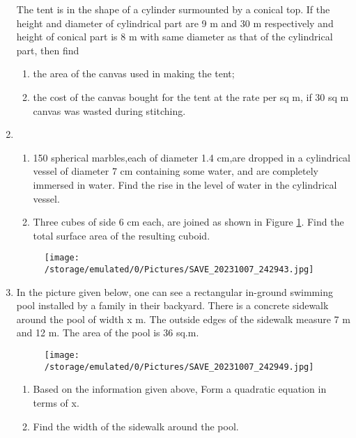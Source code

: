 \documentclass[12pt]{article}
\begin{document}
\begin{enumerate}
     
     The tent is in the shape of a cylinder surmounted by a conical top. If the height and diameter of cylindrical part are 9 m and 30 m respectively and height of conical part is 8 m with same diameter as that of the cylindrical part, then find
     \begin{enumerate}
         \item the area of the canvas used in making the tent;
         \item the cost of the canvas bought for the tent at the rate  per sq m, if 30 sq m canvas was wasted during stitching.
     \end{enumerate}

     \item
       \begin{enumerate}
           \item 150 spherical marbles,each of diameter 1.4 cm,are dropped in a cylindrical vessel of diameter 7 cm containing some water, and are completely immersed in water. Find the rise in the level of water in the cylindrical vessel.
           \item Three cubes of side 6 cm each, are joined as shown in Figure \ref{SAVE_20231007_242943}.
           Find the total surface area of the resulting cuboid.
       \end{enumerate}
       
            \begin{figure}[H]
                \centering
                \texttt{[image: /storage/emulated/0/Pictures/SAVE\_20231007\_242943.jpg]}
                \caption{}
                \label{SAVE_20231007_242943}
            \end{figure}
             \item In the picture given below, one can see a rectangular in-ground swimming pool installed by a family in their backyard. There is a concrete sidewalk around the pool of width x m. The outside edges of the sidewalk measure 7 m and 12 m. The area of the pool is 36 sq.m.
            \begin{figure}[H]
                \centering
                \texttt{[image: /storage/emulated/0/Pictures/SAVE\_20231007\_242949.jpg]}
                \caption{}
                \label{SAVE_20231007_242949}
            \end{figure}
            \begin{enumerate}
                \item Based on the information given above, Form a quadratic equation in terms of x.
                \item Find the width of the sidewalk around the pool.
            \end{enumerate}
           

\end{enumerate}
\end{document}
